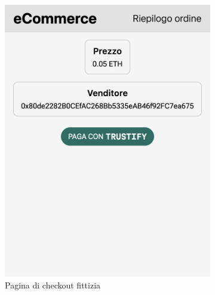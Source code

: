 \begin{figure}[H]
    \centering
    \begin{subfigure}[t]{0.32\textwidth}
    \centering
    \includegraphics[width=0.9\linewidth]{src/img/checkout.png}
    \caption{Pagina di checkout fittizia}\label{fig:checkout_page}
    \end{subfigure}
    \centering
    \begin{subfigure}[t]{0.32\textwidth}
    \centering

\end{subfigure}
\end{figure}
